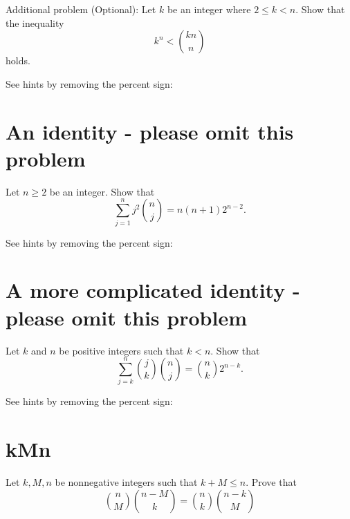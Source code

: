 \documentclass[12pt]{amsart}
\begin{document}
Additional problem (Optional): Let $k$ be an integer where $2 \leq k < n$. Show that the inequality 
\[
k^n < {kn \choose n}
\]
holds.

\noindent See hints by removing the percent sign: 




\section{An identity - please omit this problem}\label{sec:identity}
Let $n \geq 2$ be an integer.
Show that 
\[
\sum_{j=1}^n j^2 {n \choose j} = n (n+1) 2^{n-2}.
\]



\noindent See hints by removing the percent sign:



\section{A more complicated identity - please omit this problem}
Let $k$ and $n$ be positive integers such that $k < n$. 
Show that 
\[
\sum_{j=k}^n {j \choose k } {n \choose j} =  {n \choose k} 2^{n-k}.
\]

\noindent See hints by removing the percent sign:



\section{kMn}\label{sec:kMn}
Let $k, M, n$ be nonnegative integers such that $k+M \leq n$.
Prove that 
\[
{n \choose M}  {n-M \choose k} = 
{n \choose k}  {n-k \choose M} 
\]
\end{document}
